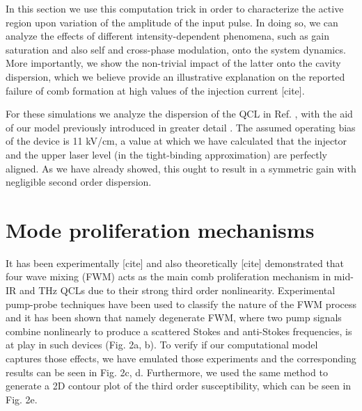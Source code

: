 \documentclass[journal]{IEEEtran}
\begin{document}
In this section we use this computation trick in order to characterize the active region upon variation of the amplitude of the input pulse. In doing so, we can analyze the effects of different intensity-dependent phenomena, such as gain saturation and also self and cross-phase modulation, onto the system dynamics. More importantly, we show the non-trivial impact of the latter onto the cavity dispersion, which we believe provide an illustrative explanation on the reported failure of comb formation at high values of the injection current [cite].

For these simulations we analyze the dispersion of the QCL in Ref. \cite{burghoff2014terahertz}, with the aid of our model previously introduced in greater detail \cite{petz2016}. The assumed operating bias of the device is 11 kV/cm, a value at which we have calculated that the injector and the upper laser level (in the tight-binding approximation) are perfectly aligned. As we have already showed, this ought to result in a symmetric gain with negligible second order dispersion. 


 



 




\section{Mode proliferation mechanisms}
It has been experimentally [cite] and also theoretically [cite] demonstrated that four wave mixing (FWM) acts as the main comb proliferation mechanism in mid-IR and THz QCLs due to their strong third order nonlinearity.  Experimental pump-probe techniques have been used to classify the nature of the FWM process and it has been shown that namely degenerate FWM, where two pump signals combine nonlinearly to produce a scattered Stokes and anti-Stokes frequencies, is at play in such devices (Fig. 2a, b). To verify if our computational model captures those effects, we have emulated those experiments and the corresponding results can be seen in Fig. 2c, d.  Furthermore, we used the same method to generate a 2D contour plot of the third order susceptibility, which can be seen in Fig. 2e.  
\end{document}
